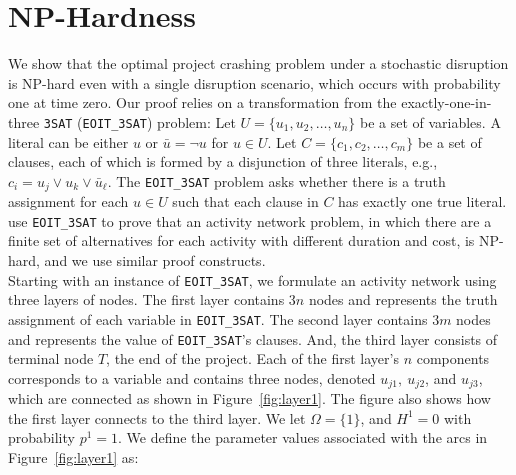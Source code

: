 \documentclass[11pt]{article}
\begin{document}
	\section{NP-Hardness} \label{sec:nphard}
	We show that the optimal project crashing problem under a stochastic disruption is NP-hard even with a single disruption scenario, which occurs with probability one at time zero.
	Our proof relies on a transformation from the exactly-one-in-three \verb|3SAT| (\verb|EOIT_3SAT|) problem: Let \(U = \{u_1,u_2, \dots, u_n\}\) be a set of variables. A literal can be either \(u\) or \(\bar{u} = \neg u\) for \(u \in U\). Let \(C = \{c_1, c_2, \dots, c_m\}\) be a set of clauses, each of which is formed by a disjunction of three literals, e.g., \(c_i = u_j \vee u_k \vee \bar{u}_{\ell}\). The \verb|EOIT_3SAT| problem asks whether there is a truth assignment for each \(u \in U\) such that each clause in \(C\) has exactly one true literal. \citet{de1997complexity} use \verb|EOIT_3SAT| to prove that an activity network problem, in which there are a finite set of alternatives for each activity with different duration and cost, is NP-hard, and we use similar proof constructs. \\
	\newline
	Starting with an instance of \verb|EOIT_3SAT|, we formulate an activity network using three layers of nodes. The first layer contains \(3n\) nodes and represents the truth assignment of each variable in \verb|EOIT_3SAT|. The second layer contains \(3m\) nodes and represents the value of \verb|EOIT_3SAT|'s clauses. And, the third layer consists of terminal node \(T\), the end of the project. Each of the first layer's \(n\) components corresponds to a variable and contains three nodes, denoted \(u_{j1},\ u_{j2}\), and \(u_{j3}\), which are connected as shown in Figure~\ref{fig:layer1}. The figure also shows how the first layer connects to the third layer. We let \(\Omega = \{1\}\), and \(H^1 = 0\) with probability \(p^1 = 1\). We define the parameter values associated with the arcs in Figure~\ref{fig:layer1} as:
\end{document}
